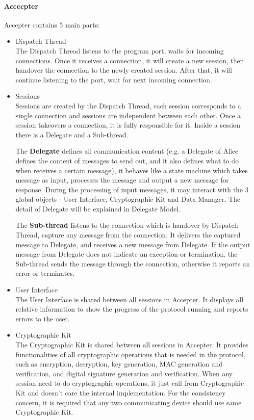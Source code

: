 \paragraph{Accecpter}
Accepter contains 5 main parts:
\begin{itemize}
\item Dispatch Thread \\
The Dispatch Thread listens to the program port, waits for incoming connections. Once it receives a connection, it will create a new session, then handover the connection to the newly created session. After that, it will continue listening to the port, wait for next incoming connection.

\item Sessions \\
Sessions are created by the Dispatch Thread, each session corresponds to a single connection and sessions are independent between each other. Once a session takeovers a connection, it is fully responsible for it. Inside a session there is a Delegate and a Sub-thread. 
\par The \textbf{Delegate} defines all communication content (e.g. a Delegate of Alice defines the content of messages to send out, and it also defines what to do when receives a certain message), it behaves like a state machine which takes message as input, processes the message and output a new message for response. During the processing of input messages, it may interact with the 3 global objects - User Interface, Cryptographic Kit and Data Manager. The detail of Delegate will be explained in Delegate Model.
\par The \textbf{Sub-thread} listens to the connection which is handover by Dispatch Thread, capture any message from the connection. It delivers the captured message to Delegate, and receives a new message from Delegate. If the output message from Delegate does not indicate an exception or termination, the Sub-thread sends the message through the connection, otherwise it reports an error or terminates.

\item User Interface \\
The User Interface is shared between all sessions in Accepter. It displays all relative information to show the progress of the protocol running and reports errors to the user.

\item Cryptographic Kit \\
The Cryptographic Kit is shared between all sessions in Accepter. It provides functionalities of all cryptographic operations that is needed in the protocol, such as encryption, decryption, key generation, MAC generation and verification, and digital signature generation and verification. When any session need to do cryptographic operations, it just call from Cryptographic Kit and doesn't care the internal implementation. For the consistency concern, it is required that any two communicating device should use same Cryptographic Kit.


\end{itemize}
